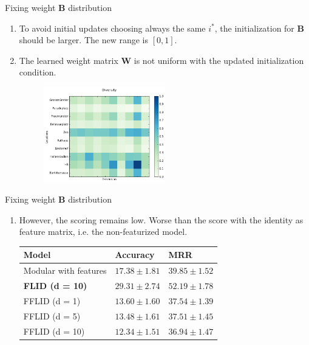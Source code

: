 \documentclass{beamer}
\begin{document}
\begin{frame}{Fixing weight $\bm{B}$ distribution}
  \begin{enumerate}
    \item To avoid initial updates choosing always the same $i^{*}$, the initialization for $\bm{B}$ should be larger. The new range is $[0, 1]$.
    \item The learned weight matrix $\bm{W}$ is not uniform  with the updated initialization condition.

    \begin{figure}[h]
      \centering
      \includegraphics[width=0.5\textwidth]{submodular_weights_f_1_l_dim_10_k_dim_0}
    \end{figure}

  \end{enumerate}
\end{frame}

\begin{frame}{Fixing weight $\bm{B}$ distribution}
  \begin{enumerate}
     \item However, the scoring remains low. Worse than the score with the identity as feature matrix, i.e. the non-featurized model.
     
     \begin{table}
       \centering
       \begin{tabular}{@{}lll@{}}
         \hline
         \textbf{Model} & \textbf{Accuracy} & \textbf{MRR} \\
         \hline
         Modular with features & $17.38 \pm 1.81$ & $39.85 \pm 1.52$ \\
         \textbf{FLID (d = 10)} & $\bm{29.31 \pm 2.74}$ & $\bm{52.19 \pm 1.78}$ \\
         FFLID (d = 1) & $13.60 \pm 1.60$ & $37.54 \pm 1.39$ \\
         FFLID (d = 5) & $13.48 \pm 1.61$ & $37.51 \pm 1.45$ \\
         FFLID (d = 10) & $12.34 \pm 1.51$ & $36.94 \pm 1.47$ \\
         \hline
       \end{tabular}
      \end{table}
  \end{enumerate}
\end{frame}
\end{document}
